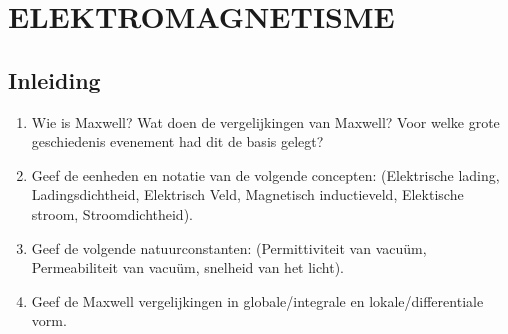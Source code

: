 \documentclass[12pt]{article}
\begin{document}
    \maketitle

    \section{ELEKTROMAGNETISME}
    \subsection{Inleiding}
    \begin{enumerate}
        \item Wie is Maxwell? Wat doen de vergelijkingen van Maxwell? Voor welke grote geschiedenis evenement had dit de basis gelegt?
        \item Geef de eenheden en notatie van de volgende concepten: (Elektrische lading, Ladingsdichtheid, Elektrisch Veld, Magnetisch inductieveld, Elektische stroom, Stroomdichtheid).
        \item Geef de volgende natuurconstanten: (Permittiviteit van vacuüm, Permeabiliteit van vacuüm, snelheid van het licht).
        \item Geef de Maxwell vergelijkingen in globale/integrale en lokale/differentiale vorm.
    \end{enumerate}
\end{document}
